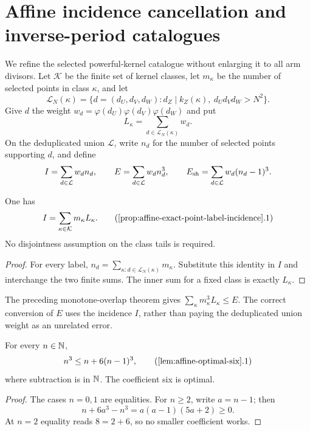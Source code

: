 \section{Affine incidence cancellation and inverse-period catalogues}
\label{sec:affine-inverse-period-catalogue}

We refine the selected powerful-kernel catalogue without enlarging it to all
arm divisors.  Let $\mathcal K$ be the finite set of kernel classes, let
$m_\kappa$ be the number of selected points in class $\kappa$, and let
\[
 \mathcal L_N(\kappa)=
 \{d=(d_U,d_V,d_W):d_Z\mid k_Z(\kappa),\ d_Ud_Vd_W>N^2\}.
\]
Give $d$ the weight
$w_d=\varphi(d_U)\varphi(d_V)\varphi(d_W)$ and put
\[
 L_\kappa=\sum_{d\in\mathcal L_N(\kappa)}w_d.
\]
On the deduplicated union $\mathcal L$, write $n_d$ for the number of
selected points supporting $d$, and define
\[
 I=\sum_{d\in\mathcal L}w_dn_d,\qquad
 E=\sum_{d\in\mathcal L}w_dn_d^3,\qquad
 E_{\rm sh}=\sum_{d\in\mathcal L}w_d(n_d-1)^3.
\]

\begin{proposition}
\label{prop:affine-exact-point-label-incidence}
One has
\[
                     I=\sum_{\kappa\in\mathcal K}m_\kappa L_\kappa.
 \tag{\ref{prop:affine-exact-point-label-incidence}.1}
\]
No disjointness assumption on the class tails is required.
\end{proposition}

\begin{proof}
For every label,
$n_d=\sum_{\kappa:d\in\mathcal L_N(\kappa)}m_\kappa$.  Substitute this
identity in $I$ and interchange the two finite sums.  The inner sum for a
fixed class is exactly $L_\kappa$.
\end{proof}

The preceding monotone-overlap theorem gives
$\sum_\kappa m_\kappa^3L_\kappa\le E$.  The correct conversion of $E$
uses the incidence $I$, rather than paying the deduplicated union weight as
an unrelated error.

\begin{lemma}
\label{lem:affine-optimal-six}
For every $n\in\mathbb N$,
\[
                         n^3\le n+6(n-1)^3,             \tag{\ref{lem:affine-optimal-six}.1}
\]
where subtraction is in $\mathbb N$.  The coefficient six is optimal.
\end{lemma}

\begin{proof}
The cases $n=0,1$ are equalities.  For $n\ge2$, write $a=n-1$; then
\[
 n+6a^3-n^3=a(a-1)(5a+2)\ge0.
\]
At $n=2$ equality reads $8=2+6$, so no smaller coefficient works.
\end{proof}

